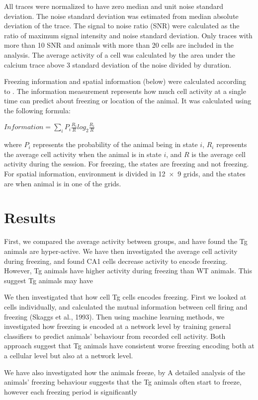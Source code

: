 All traces were normalized to have zero median and unit noise standard deviation. The noise standard deviation was estimated from median absolute deviation of the trace. The signal to noise ratio (SNR) were calculated as the ratio of maximum signal intensity and noise standard deviation. Only traces with more than 10 SNR and animals with more than 20 cells are included in the analysis. The average activity of a cell was calculated by the area under the calcium trace above 3 standard deviation of the noise divided by duration.

Freezing information and spatial information (below) were calculated according to \citet{skaggs93}. The information measurement represents how much cell activity at a single time can predict about freezing or location of the animal.  It was calculated using the following formula:

$Information = \displaystyle\sum_{i}^{}P_i  \frac{R_i}{R} log_2 \frac{R_i}{R}$

where $P_i$ represents the probability of the animal being in state $i$,  $R_i$ represents the average cell activity when the animal is in state $i$, and $R$ is the average cell activity during the session. For freezing, the states are freezing and not freezing. For spatial information, environment is divided in \num{12 x 9} grids, and the states are when animal is in one of the grids.

\section{Results}
First, we compared the average activity between groups, and have found the Tg animals are hyper-active. We have then investigated the average cell activity during freezing, and found CA1 cells decrease activity to encode freezing. However, Tg animals have higher activity during freezing than WT animals. This suggest Tg animals may have 

We then investigated that how cell Tg cells encodes freezing. First we looked at cells individually, and calculated the mutual information between cell firing and freezing (Skaggs et al., 1993). Then using machine learning methods, we investigated how freezing is encoded at a network level by training general classifiers to predict animals' behaviour from recorded cell activity. Both approach suggest that Tg animals have consistent worse freezing encoding both at a cellular level but also at a network level. 

We have also investigated how the animals freeze, by A detailed analysis of the animals' freezing behaviour suggests that the Tg animals often start to freeze, however each freezing period is significantly 

